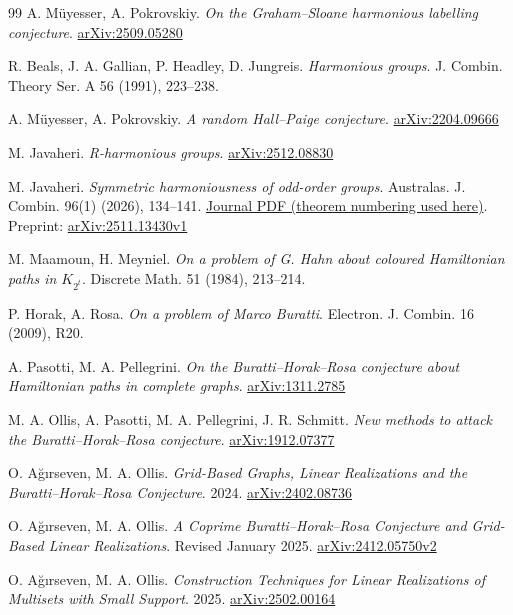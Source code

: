 \begin{thebibliography}{99}
 A. M\"uyesser, A. Pokrovskiy. \emph{On the Graham--Sloane harmonious labelling conjecture}. \href{https://arxiv.org/abs/2509.05280}{arXiv:2509.05280}

 R. Beals, J. A. Gallian, P. Headley, D. Jungreis. \emph{Harmonious groups}. J. Combin. Theory Ser. A 56 (1991), 223--238.

 A. M\"uyesser, A. Pokrovskiy. \emph{A random Hall--Paige conjecture}. \href{https://arxiv.org/abs/2204.09666}{arXiv:2204.09666}

 M. Javaheri. \emph{R-harmonious groups}. \href{https://arxiv.org/abs/2512.08830}{arXiv:2512.08830}

 M. Javaheri. \emph{Symmetric harmoniousness of odd-order groups}. Australas. J. Combin. 96(1) (2026), 134--141. \href{https://ajc.maths.uq.edu.au/download/96/ajc_v96_p134.pdf}{Journal PDF (theorem numbering used here)}. Preprint: \href{https://arxiv.org/abs/2511.13430v1}{arXiv:2511.13430v1}

 M. Maamoun, H. Meyniel. \emph{On a problem of G. Hahn about coloured Hamiltonian paths in $K_{2^t}$}. Discrete Math. 51 (1984), 213--214.

 P. Horak, A. Rosa. \emph{On a problem of Marco Buratti}. Electron. J. Combin. 16 (2009), R20.

 A. Pasotti, M. A. Pellegrini. \emph{On the Buratti--Horak--Rosa conjecture about Hamiltonian paths in complete graphs}. \href{https://arxiv.org/abs/1311.2785}{arXiv:1311.2785}

 M. A. Ollis, A. Pasotti, M. A. Pellegrini, J. R. Schmitt. \emph{New methods to attack the Buratti--Horak--Rosa conjecture}. \href{https://arxiv.org/abs/1912.07377}{arXiv:1912.07377}

 O. A\u{g}\i rseven, M. A. Ollis. \emph{Grid-Based Graphs, Linear Realizations and the Buratti--Horak--Rosa Conjecture}. 2024. \href{https://arxiv.org/abs/2402.08736}{arXiv:2402.08736}

 O. A\u{g}\i rseven, M. A. Ollis. \emph{A Coprime Buratti--Horak--Rosa Conjecture and Grid-Based Linear Realizations}. Revised January 2025. \href{https://arxiv.org/abs/2412.05750v2}{arXiv:2412.05750v2}

 O. A\u{g}\i rseven, M. A. Ollis. \emph{Construction Techniques for Linear Realizations of Multisets with Small Support}. 2025. \href{https://arxiv.org/abs/2502.00164}{arXiv:2502.00164}

\end{thebibliography}
